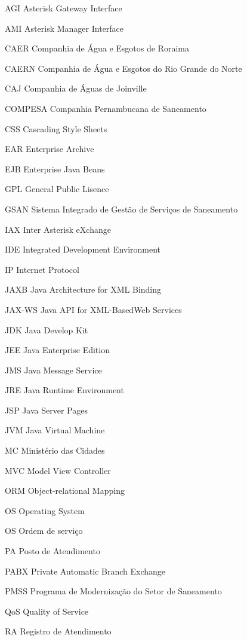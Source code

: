 \begin{siglas}
	\item[AGI] Asterisk Gateway Interface
	\item[AMI] Asterisk Manager Interface
	\item[CAER] Companhia de Água e Esgotos de Roraima
	\item[CAERN] Companhia de Água e Esgotos do Rio Grande do Norte
	\item[CAJ] Companhia de Águas de Joinville
	\item[COMPESA] Companhia Pernambucana de Saneamento
	\item[CSS] Cascading Style Sheets
	\item[EAR] Enterprise Archive
	\item[EJB] Enterprise Java Beans
	\item[GPL] General Public Lisence
	\item[GSAN] Sistema Integrado de Gestão de Serviços de Saneamento
	\item[IAX] Inter Asterisk eXchange
	\item[IDE] Integrated Development Environment
	\item[IP] Internet Protocol
	\item[JAXB] Java Architecture for XML Binding
	\item[JAX-WS] Java API for XML-BasedWeb Services
	\item[JDK] Java Develop Kit
	\item[JEE] Java Enterprise Edition
	\item[JMS] Java Message Service
	\item[JRE] Java Runtime Environment
	\item[JSP] Java Server Pages
	\item[JVM] Java Virtual Machine
	\item[MC] Ministério das Cidades
	\item[MVC] Model View Controller
	\item[ORM] Object-relational Mapping
	\item[OS] Operating System
	\item[OS] Ordem de serviço
	\item[PA] Posto de Atendimento
	\item[PABX] Private Automatic Branch Exchange
	\item[PMSS] Programa de Modernização do Setor de Saneamento
	\item[QoS] Quality of Service
	\item[RA] Registro de Atendimento

\end{siglas}
